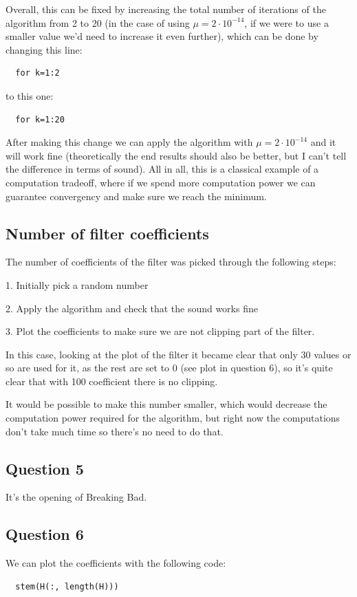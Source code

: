 \documentclass[conference,9pt]{IEEEtran}
\begin{document}
Overall, this can be fixed by increasing the total number of iterations of the algorithm from 2 to 20 (in the case of using $\mu=2\cdot 10^{-14}$, if we were to use a smaller value we'd need to increase it even further), which can be done by changing this line:
\begin{verbatim}
  for k=1:2
\end{verbatim}

to this one:
\begin{verbatim}
  for k=1:20
\end{verbatim}

After making this change we can apply the algorithm with $\mu=2\cdot 10^{-14}$ and it will work fine (theoretically the end results should also be better, but I can't tell the difference in terms of sound). All in all, this is a classical example of a computation tradeoff, where if we spend more computation power we can guarantee convergency and make sure we reach the minimum.

\subsection{Number of filter coefficients}

The number of coefficients of the filter was picked through the following steps:

1. Initially pick a random number

2. Apply the algorithm and check that the sound works fine

3. Plot the coefficients to make sure we are not clipping part of the filter.

In this case, looking at the plot of the filter it became clear that only 30 values or so are used for it, as the rest are set to 0 (see plot in question 6), so it's quite clear that with 100 coefficient there is no clipping.

It would be possible to make this number smaller, which would decrease the computation power required for the algorithm, but right now the computations don't take much time so there's no need to do that.

\subsection{Question 5}
It's the opening of Breaking Bad.

\subsection{Question 6}
We can plot the coefficients with the following code:
\begin{verbatim}
  stem(H(:, length(H)))
\end{verbatim}
\end{document}
